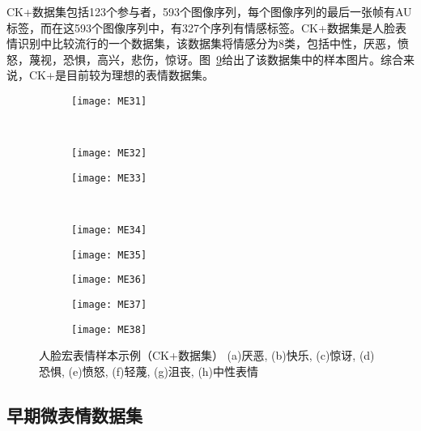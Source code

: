 CK+数据集包括123个参与者，593个图像序列，每个图像序列的最后一张帧有AU标签，而在这593个图像序列中，有327个序列有情感标签。CK+数据集是人脸表情识别中比较流行的一个数据集，该数据集将情感分为8类，包括中性，厌恶，愤怒，蔑视，恐惧，高兴，悲伤，惊讶。图~\ref{fig1}给出了该数据集中的样本图片。综合来说，CK+是目前较为理想的表情数据集。

\begin{figure}[!htbp]
    \centering
    \begin{subfigure}[b]{0.22\textwidth}
      \texttt{[image: ME31]}
      \caption{}
      \label{fig3.1}
    \end{subfigure}%
    ~%
    \begin{subfigure}[b]{0.22\textwidth}
      \texttt{[image: ME32]}
      \caption{}
      \label{fig3.2}
    \end{subfigure}
    \begin{subfigure}[b]{0.22\textwidth}
      \texttt{[image: ME33]}
      \caption{}
      \label{fig3.3}
    \end{subfigure}%
    ~%
    \begin{subfigure}[b]{0.22\textwidth}
      \texttt{[image: ME34]}
      \caption{}
      \label{fig3.4}
    \end{subfigure}
    \begin{subfigure}[b]{0.22\textwidth}
      \texttt{[image: ME35]}
      \caption{}
      \label{fig3.5}
    \end{subfigure}
    \begin{subfigure}[b]{0.22\textwidth}
      \texttt{[image: ME36]}
      \caption{}
      \label{fig3.6}
    \end{subfigure}
    \begin{subfigure}[b]{0.22\textwidth}
      \texttt{[image: ME37]}
      \caption{}
      \label{fig3.7}
    \end{subfigure}
    \begin{subfigure}[b]{0.22\textwidth}
      \texttt{[image: ME38]}
      \caption{}
      \label{fig3.8}
    \end{subfigure}
    \caption{人脸宏表情样本示例（CK+数据集）
            (a)厌恶, (b)快乐, (c)惊讶, (d)恐惧, (e)愤怒, (f)轻蔑, (g)沮丧, (h)中性表情}
    \label{fig1}
\end{figure}

\subsection{早期微表情数据集}

